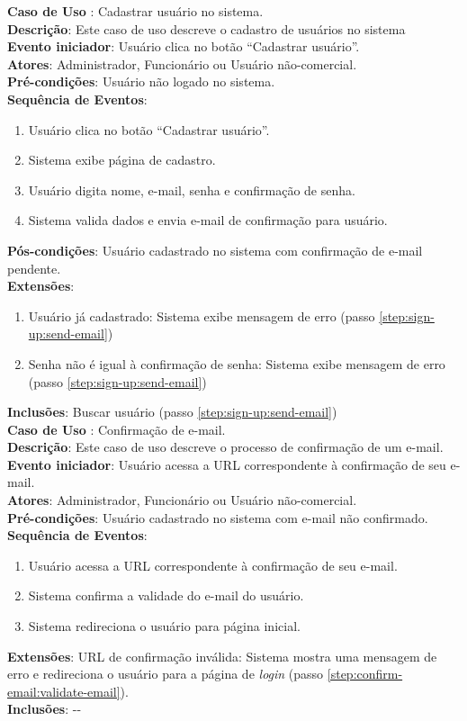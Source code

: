 \documentclass[]{politex}
\begin{document}
\noindent \textbf{Caso de Uso }: Cadastrar usuário no sistema.  \\
\textbf{Descrição}: Este caso de uso descreve o cadastro de usuários no sistema \\
\textbf{Evento iniciador}: Usuário clica no botão ``Cadastrar usuário''. \\
\textbf{Atores}: Administrador, Funcionário ou Usuário não-comercial. \\
\textbf{Pré-condições}: Usuário não logado no sistema. \\
\textbf{Sequência de Eventos}:
\begin{enumerate}
\item Usuário clica no botão ``Cadastrar usuário''.
\item Sistema exibe página de cadastro.
\item Usuário digita nome, e-mail, senha e confirmação de senha.
\item\label{step:sign-up:send-email} Sistema valida dados e envia e-mail de confirmação para usuário.
\end{enumerate}
\textbf{Pós-condições}: Usuário cadastrado no sistema com confirmação de e-mail pendente. \\
\textbf{Extensões}:
\begin{enumerate}
\item Usuário já cadastrado: Sistema exibe mensagem de erro (passo \ref{step:sign-up:send-email})
\item Senha não é igual à confirmação de senha: Sistema exibe mensagem de erro (passo \ref{step:sign-up:send-email})
\end{enumerate}
\textbf{Inclusões}: Buscar usuário (passo \ref{step:sign-up:send-email}) \\

\noindent \textbf{Caso de Uso }: Confirmação de e-mail. \\
\textbf{Descrição}: Este caso de uso descreve o processo de confirmação de um e-mail. \\
\textbf{Evento iniciador}: Usuário acessa a URL correspondente à confirmação de seu e-mail. \\
\textbf{Atores}: Administrador, Funcionário ou Usuário não-comercial. \\
\textbf{Pré-condições}: Usuário cadastrado no sistema com e-mail não confirmado. \\
\textbf{Sequência de Eventos}:
\begin{enumerate}
\item Usuário acessa a URL correspondente à confirmação de seu e-mail.
\item\label{step:confirm-email:validate-email} Sistema confirma a validade do e-mail do usuário.
\item Sistema redireciona o usuário para página inicial.
\end{enumerate}
\textbf{Extensões}: URL de confirmação inválida: Sistema mostra uma mensagem de
erro e redireciona o usuário para a página de \textit{login} (passo \ref{step:confirm-email:validate-email}). \\
\textbf{Inclusões}: -{}- \\
\end{document}
